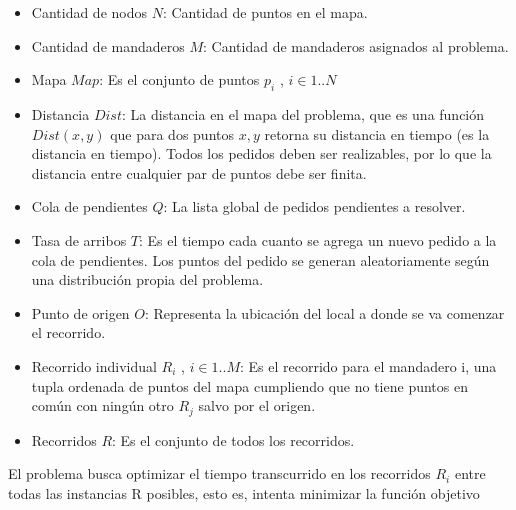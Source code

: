 \documentclass[9pt,conference]{IEEEtran}
\begin{document}
	\begin{itemize}
		\item Cantidad de nodos $N$: Cantidad de puntos en el mapa.\\
		
		\item Cantidad de mandaderos $M$: Cantidad de mandaderos asignados al problema.\\
		
		\item Mapa $Map$: Es el conjunto de puntos $ p_i $ , $ i \in 1 .. N $\\
		
		\item Distancia $Dist$: La distancia en el mapa del problema, que es una función $Dist(x,y)$ que para dos puntos $x,y$ retorna su distancia en tiempo (es la distancia en tiempo). Todos los pedidos deben ser realizables, por lo que la distancia entre cualquier par de puntos debe ser finita.\\
		
		\item Cola de pendientes $Q$: La lista global de pedidos pendientes a resolver.\\

		\item Tasa de arribos $T$: Es el tiempo cada cuanto se agrega un nuevo pedido a la cola de pendientes. Los puntos del pedido se generan aleatoriamente según una distribución propia del problema.\\

		\item Punto de origen $O$: Representa la ubicación del local a donde se va comenzar el recorrido.\\
		
		\item Recorrido individual $R_i $ , $i \in 1 .. M$: Es el recorrido para el mandadero i, una tupla ordenada de puntos del mapa cumpliendo que no tiene puntos en común con ningún otro $R_j$ salvo por el origen.\\

		\item Recorridos $R$: Es el conjunto de todos los recorridos.\\

	\end{itemize}

	El problema busca optimizar el tiempo transcurrido en los recorridos $R_i$ entre todas las instancias R posibles, esto es, intenta minimizar la función objetivo
\end{document}
